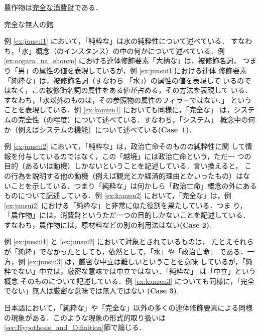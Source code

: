 \begin{exx}\rm
  \label{ex:kanzen2}
  \hspace*{.5cm} 農作物は\underline{完全な消費財}である．
\end{exx}

\begin{exx}\rm
  \label{ex:kanzen3}
  \hspace*{.5cm} 完全な無人の館
\end{exx}

例  \ref{ex:junsui1} において，「純粋な」は水の純粋性について述べている．
すなわち，「水」概念（のインスタンス）の中の何かについて述べている．例 
\ref{ex:oogara_na_shonen} における連体修飾要素「大柄な」は，被修飾名詞，
つまり「男」の属性の値を表現しているが，例 \ref{ex:junsui1}における連体
修飾要素「純粋な」は，被修飾名詞（すなわち 「水」）の属性の値を表現して
いるのではなく，この被修飾名詞の属性をある値が占める，その方法を表現して
いる．すなわち，「水以外のものは，その参照物の属性のフィラーではない．」
ということを表現している．例 \ref{ex:kanzen1} においても同様に，「完全な」
は，システムの完全性（の程度）について述べている．すなわち，「システム」 
概念中の何か（例えばシステムの機能）について述べている{\bf (Case~1)}．

例 \ref{ex:junsui2} において，「純粋な」は，政治亡命そのものの純粋性に関
して情報を付与しているのではなく，この「越境」には政治亡命という，ただ一
つの目的（あるいは動機）しかないということを記述している．言い換えると，
この行為を説明する他の動機（例えば観光とか経済的理由とかいったもの）はな
いことを示している．つまり「純粋な」は何かしら「政治亡命」概念の外にある
ものについて記述している．例 \ref{ex:kanzen2} において，「完全な」は，例 
\ref{ex:junsui2} における「純粋な」と非常に似た役割を果たしている．つま
り，「農作物」には，消費財というただ一つの目的しかないことを記述している．
すなわち，農作物には，原材料などの別の利用法はない{\bf (Case 2)}.

例 \ref{ex:junsui1} と \ref{ex:junsui2} において対象とされているものは，
たとえそれらが「純粋」でなかったとしても，依然として，「水」や「政治亡命」 
である．一方，例 \ref{ex:junsui3} は，厳密な中立は難しいということを意味
しているが，「純粋でない」中立は，厳密な意味では中立ではない．「純粋な」
は「中立」という概念 そのものについて記述している．例 \ref{ex:kanzen3} 
についても同様に，「完全でない」無人は厳密な意味では無人ではない{\bf
(Case 3)}.  

日本語において，「純粋な」や「完全な」以外の多くの連体修飾要素による同様
の現象がある．このような現象の形式的取り扱いは
\ref{sec:Hypothesis_and_Difinition}節で論じる． 

